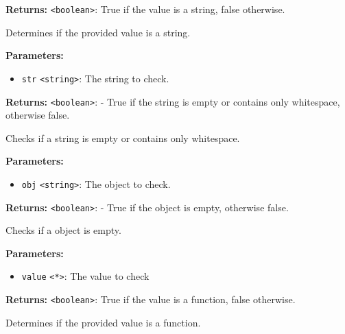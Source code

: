 \documentclass[12pt,a4paper]{article}
\begin{document}
\noindent \textbf{Returns:} \texttt{<boolean>}: True if the value is a string, false otherwise.

\noindent Determines if the provided value is a string.

\vspace{5mm}
\noindent {}


\noindent \textbf{Parameters:}
\begin{itemize}
  \item \texttt{str} \texttt{<string>}: The string to check.
\end{itemize}

\noindent \textbf{Returns:} \texttt{<boolean>}: - True if the string is empty or contains only whitespace, otherwise false.

\noindent Checks if a string is empty or contains only whitespace.

\vspace{5mm}
\noindent {}


\noindent \textbf{Parameters:}
\begin{itemize}
  \item \texttt{obj} \texttt{<string>}: The object to check.
\end{itemize}

\noindent \textbf{Returns:} \texttt{<boolean>}: - True if the object is empty, otherwise false.

\noindent Checks if a object is empty.

\vspace{5mm}
\noindent {}


\noindent \textbf{Parameters:}
\begin{itemize}
  \item \texttt{value} \texttt{<*>}: The value to check
\end{itemize}

\noindent \textbf{Returns:} \texttt{<boolean>}: True if the value is a function, false otherwise.

\noindent Determines if the provided value is a function.
\end{document}
